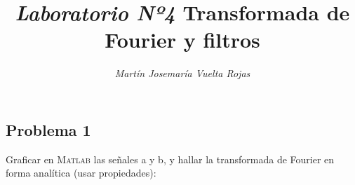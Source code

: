 \documentclass[a4paper,12pt,final]{article}
\begin{document}
  \title{\textit{\Large Laboratorio Nº4}\linebreak{}\linebreak{}
  \textbf{\Huge Transformada de Fourier y filtros}}
  \author{\emph{Martín Josemaría Vuelta Rojas}}
  \maketitle

  \subsection*{Problema 1}

    \noindent Graficar en \textsc{Matlab} las señales a y b, y hallar
      la transformada de Fourier en forma analítica (usar propiedades):
\end{document}
